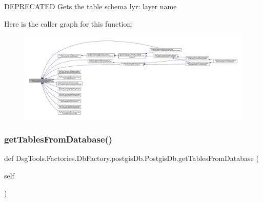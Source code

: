 \begin{DoxyVerb}DEPRECATED
Gets the table schema
lyr: layer name
\end{DoxyVerb}
 Here is the caller graph for this function\+:
\nopagebreak
\begin{figure}[H]
\begin{center}
\leavevmode
\includegraphics[width=350pt]{class_dsg_tools_1_1_factories_1_1_db_factory_1_1postgis_db_1_1_postgis_db_a6fda820eb975b10f79452e95fe3225cc_icgraph}
\end{center}
\end{figure}
\mbox{\label{class_dsg_tools_1_1_factories_1_1_db_factory_1_1postgis_db_1_1_postgis_db_a39cf35c860d0470af3aba54955dd0c19}} 
\subsubsection{\texorpdfstring{get\+Tables\+From\+Database()}{getTablesFromDatabase()}}
{\footnotesize\ttfamily def Dsg\+Tools.\+Factories.\+Db\+Factory.\+postgis\+Db.\+Postgis\+Db.\+get\+Tables\+From\+Database (\begin{DoxyParamCaption}\item[{}]{self }\end{DoxyParamCaption})}

